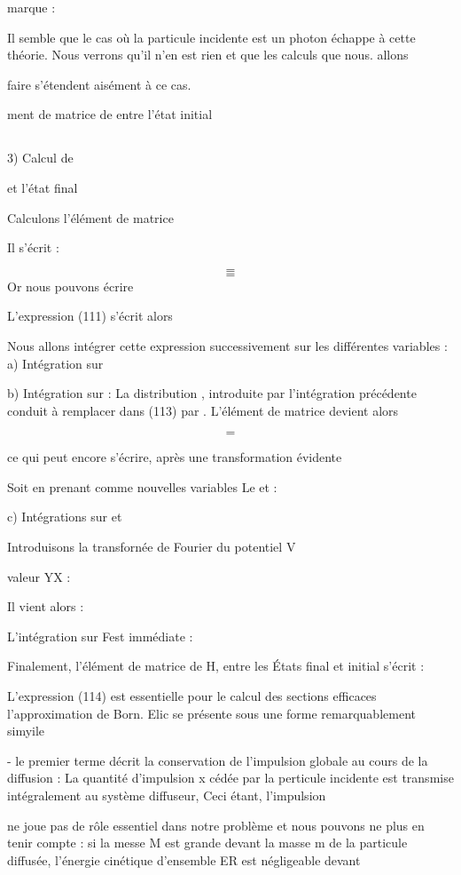 {{{marque :

Il semble que le cas où la particule incidente est un photon échappe à cette
théorie. Nous verrons qu’il n'en est rien et que les calculs que nous. allons

faire s'étendent aisément à ce cas.

ment de matrice  de  entre l'état initial

\subsection{}%
3) Calcul de

et l'état final

Calculons l'élément de matrice 

Il s'écrit :
 
\[
\tag{112}=
\]
\[
\tag{113}=
\]
Or nous pouvons écrire

L'expression (111) s'écrit alors

Nous allons intégrer cette expression successivement sur les différentes variables :
a) Intégration sur

b) Intégration sur  :
La distribution , introduite par l'intégration précédente conduit à
remplacer dans (113)  par .
L'élément de matrice devient alors
 
\[
\tag{114}=
\]


ce qui peut encore s'écrire, après une transformation évidente

Soit en prenant comme nouvelles variables Le  et  :

c) Intégrations sur  et 

Introduisons la transfornée de Fourier du potentiel V

valeur YX :

Il vient alors :

L'intégration sur Fest immédiate :

Finalement, l'élément de matrice de H, entre les États final et initial s'écrit :

L'expression (114) est essentielle pour le calcul des sections efficaces  l'approximation
de Born. Elic se présente sous une forme remarquablement simyile

- le premier terme  décrit la conservation de l'impulsion globale au
cours de la diffusion : La quantité d'impulsion x cédée par la perticule incidente
est transmise intégralement au système diffuseur, Ceci étant, l'impulsion 


 ne joue pas de rôle essentiel dans notre problème et nous pouvons ne
plus en tenir compte : si la messe M est grande devant la masse m de la particule
diffusée, l'énergie cinétique d'ensemble ER est négligeable devant

}}}
